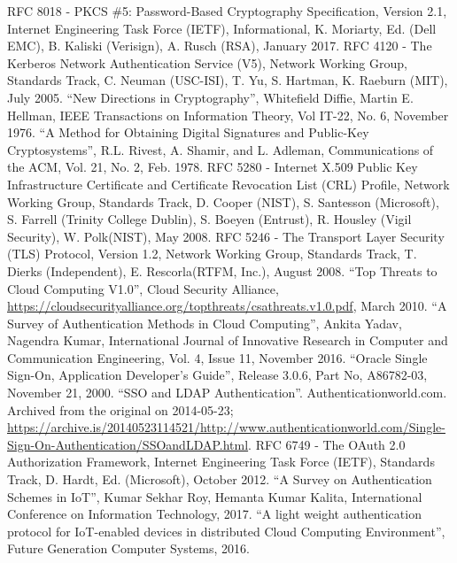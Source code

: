 \begin{multicols}{2}
\begin{thebibliography}{99}
 RFC 8018 - PKCS \#5: Password-Based Cryptography Specification, Version 2.1, Internet Engineering Task Force (IETF), Informational, K. Moriarty, Ed. (Dell EMC), B. Kaliski (Verisign), A. Rusch (RSA), January 2017. 
 RFC 4120 - The Kerberos Network Authentication Service (V5), Network Working Group, Standards Track, C. Neuman (USC-ISI), T. Yu, S. Hartman, K. Raeburn (MIT), July 2005.
 ``New Directions in Cryptography'', Whitefield Diffie, Martin E. Hellman, IEEE Transactions on Information Theory, Vol IT-22, No. 6, November 1976.
 ``A Method for Obtaining Digital Signatures and Public-Key Cryptosystems'', R.L. Rivest, A. Shamir, and L. Adleman, Communications of the ACM, Vol. 21, No. 2, Feb. 1978.
 RFC 5280 - Internet X.509 Public Key Infrastructure Certificate and Certificate Revocation List (CRL) Profile, Network Working Group, Standards Track, D. Cooper (NIST), S. Santesson (Microsoft), S. Farrell (Trinity College Dublin), S. Boeyen (Entrust), R. Housley (Vigil Security), W. Polk(NIST), May 2008.
 RFC 5246 - The Transport Layer Security (TLS) Protocol, Version 1.2, Network Working Group, Standards Track, T. Dierks (Independent), E. Rescorla(RTFM, Inc.), August 2008.
 ``Top Threats to Cloud Computing V1.0'', Cloud Security Alliance, \url{https://cloudsecurityalliance.org/topthreats/csathreats.v1.0.pdf}, March 2010.
 ``A Survey of Authentication Methods in Cloud Computing'', Ankita Yadav, Nagendra Kumar, International Journal of Innovative Research in Computer and Communication Engineering, Vol. 4, Issue 11, November 2016.
 ``Oracle Single Sign-On, Application Developer's Guide'', Release 3.0.6, Part No, A86782-03, November 21, 2000.
 ``SSO and LDAP Authentication''. Authenticationworld.com. Archived from the original on 2014-05-23; \url{https://archive.is/20140523114521/http://www.authenticationworld.com/Single-Sign-On-Authentication/SSOandLDAP.html}.
 RFC 6749 - The OAuth 2.0 Authorization Framework, Internet Engineering Task Force (IETF), Standards Track, D. Hardt, Ed. (Microsoft), October 2012.
 ``A Survey on Authentication Schemes in IoT'', Kumar Sekhar Roy, Hemanta Kumar Kalita, International Conference on Information Technology, 2017.
 ``A light weight authentication protocol for IoT-enabled devices in distributed Cloud Computing Environment'', Future Generation Computer Systems, 2016.

\end{thebibliography}
\end{multicols}
